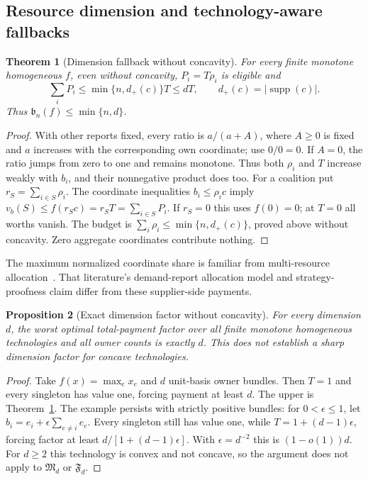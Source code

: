 \documentclass[11pt]{article}
\newtheorem{theorem}{Theorem}[section]
\newtheorem{proposition}[theorem]{Proposition}
\theoremstyle{definition}\newtheorem{definition}[theorem]{Definition}
\theoremstyle{remark}\newtheorem{remark}[theorem]{Remark}
\begin{document}
\subsection{Resource dimension and technology-aware fallbacks}
\begin{theorem}[Dimension fallback without concavity]\label{ext:thm:dimension}
For every finite monotone homogeneous $f$, even without concavity,
$P_i=T\rho_i$ is eligible and
\[
 \sum_iP_i\le\min\{n,d_+(c)\}T\le dT,
 \qquad d_+(c)=|\operatorname{supp}(c)|.
\]
Thus $\mathfrak b_n(f)\le\min\{n,d\}$.
\end{theorem}
\begin{proof}
With other reports fixed, every ratio is $a/(a+A)$, where $A\ge0$ is fixed
and $a$ increases with the corresponding own coordinate; use $0/0=0$.
If $A=0$, the ratio jumps from zero to one and remains monotone.
Thus both $\rho_i$ and $T$ increase weakly with $b_i$, and their nonnegative
product does too.  For a coalition put $r_S=\sum_{i\in S}\rho_i$.
The coordinate inequalities $b_i\le\rho_ic$ imply
$v_b(S)\le f(r_Sc)=r_ST=\sum_{i\in S}P_i$.
If $r_S=0$ this uses $f(0)=0$; at $T=0$ all worths vanish.
The budget is $\sum_i\rho_i\le\min\{n,d_+(c)\}$, proved above without
concavity.  Zero aggregate coordinates contribute nothing.
\end{proof}
The maximum normalized coordinate share is familiar from multi-resource
allocation~\cite{Ghodsi}.  That literature's demand-report allocation model
and strategy-proofness claim differ from these supplier-side payments.

\begin{proposition}[Exact dimension factor without concavity]\label{ext:prop:sharp-d}
For every dimension $d$, the worst optimal total-payment factor over all
finite monotone homogeneous technologies and all owner counts is exactly $d$.
This does not establish a sharp dimension factor for concave technologies.
\end{proposition}
\begin{proof}
Take $f(x)=\max_ex_e$ and $d$ unit-basis owner bundles.
Then $T=1$ and every singleton has value one, forcing payment at least $d$.
The upper is Theorem~\ref{ext:thm:dimension}.
The example persists with strictly positive bundles: for $0<\epsilon\le1$,
let $b_i=e_i+\epsilon\sum_{e\ne i}e_e$.  Every singleton still has value one,
while $T=1+(d-1)\epsilon$, forcing factor at least
$d/[1+(d-1)\epsilon]$.  With $\epsilon=d^{-2}$ this is $(1-o(1))d$.
For $d\ge2$ this technology is convex and not concave, so the argument does
not apply to $\mathfrak M_d$ or $\mathfrak F_d$.
\end{proof}
\end{document}
